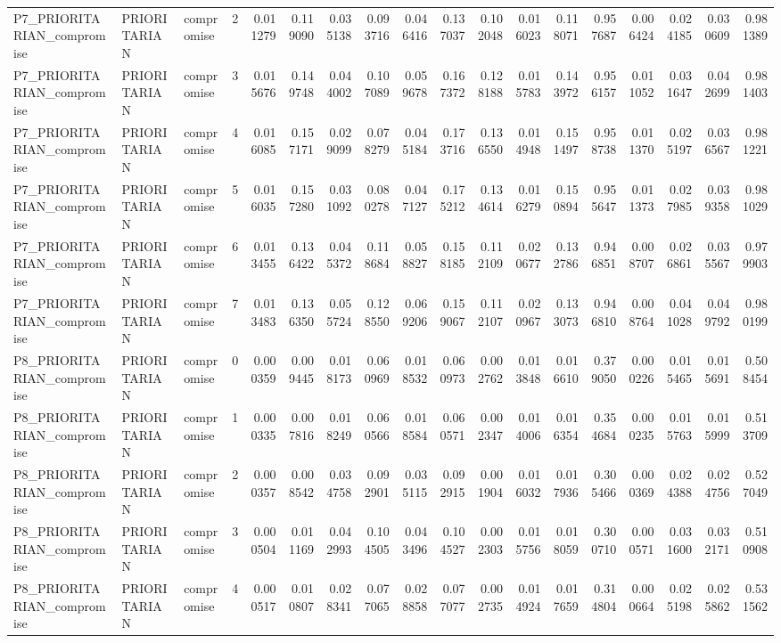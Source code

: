 \begin{tabular}{lllrrrrrrrrrrrrrrr}
P7_PRIORITARIAN_compromise & PRIORITARIAN & compromise & 2 & 0.011279 & 0.119090 & 0.035138 & 0.093716 & 0.046416 & 0.137037 & 0.102048 & 0.016023 & 0.118071 & 0.957687 & 0.006424 & 0.024185 & 0.030609 & 0.981389 \\
P7_PRIORITARIAN_compromise & PRIORITARIAN & compromise & 3 & 0.015676 & 0.149748 & 0.044002 & 0.107089 & 0.059678 & 0.167372 & 0.128188 & 0.015783 & 0.143972 & 0.956157 & 0.011052 & 0.031647 & 0.042699 & 0.981403 \\
P7_PRIORITARIAN_compromise & PRIORITARIAN & compromise & 4 & 0.016085 & 0.157171 & 0.029099 & 0.078279 & 0.045184 & 0.173716 & 0.136550 & 0.014948 & 0.151497 & 0.958738 & 0.011370 & 0.025197 & 0.036567 & 0.981221 \\
P7_PRIORITARIAN_compromise & PRIORITARIAN & compromise & 5 & 0.016035 & 0.157280 & 0.031092 & 0.080278 & 0.047127 & 0.175212 & 0.134614 & 0.016279 & 0.150894 & 0.955647 & 0.011373 & 0.027985 & 0.039358 & 0.981029 \\
P7_PRIORITARIAN_compromise & PRIORITARIAN & compromise & 6 & 0.013455 & 0.136422 & 0.045372 & 0.118684 & 0.058827 & 0.158185 & 0.112109 & 0.020677 & 0.132786 & 0.946851 & 0.008707 & 0.026861 & 0.035567 & 0.979903 \\
P7_PRIORITARIAN_compromise & PRIORITARIAN & compromise & 7 & 0.013483 & 0.136350 & 0.055724 & 0.128550 & 0.069206 & 0.159067 & 0.112107 & 0.020967 & 0.133073 & 0.946810 & 0.008764 & 0.041028 & 0.049792 & 0.980199 \\
P8_PRIORITARIAN_compromise & PRIORITARIAN & compromise & 0 & 0.000359 & 0.009445 & 0.018173 & 0.060969 & 0.018532 & 0.060973 & 0.002762 & 0.013848 & 0.016610 & 0.379050 & 0.000226 & 0.015465 & 0.015691 & 0.508454 \\
P8_PRIORITARIAN_compromise & PRIORITARIAN & compromise & 1 & 0.000335 & 0.007816 & 0.018249 & 0.060566 & 0.018584 & 0.060571 & 0.002347 & 0.014006 & 0.016354 & 0.354684 & 0.000235 & 0.015763 & 0.015999 & 0.513709 \\
P8_PRIORITARIAN_compromise & PRIORITARIAN & compromise & 2 & 0.000357 & 0.008542 & 0.034758 & 0.092901 & 0.035115 & 0.092915 & 0.001904 & 0.016032 & 0.017936 & 0.305466 & 0.000369 & 0.024388 & 0.024756 & 0.527049 \\
P8_PRIORITARIAN_compromise & PRIORITARIAN & compromise & 3 & 0.000504 & 0.011169 & 0.042993 & 0.104505 & 0.043496 & 0.104527 & 0.002303 & 0.015756 & 0.018059 & 0.300710 & 0.000571 & 0.031600 & 0.032171 & 0.510908 \\
P8_PRIORITARIAN_compromise & PRIORITARIAN & compromise & 4 & 0.000517 & 0.010807 & 0.028341 & 0.077065 & 0.028858 & 0.077077 & 0.002735 & 0.014924 & 0.017659 & 0.314804 & 0.000664 & 0.025198 & 0.025862 & 0.531562 \\

\end{tabular}
